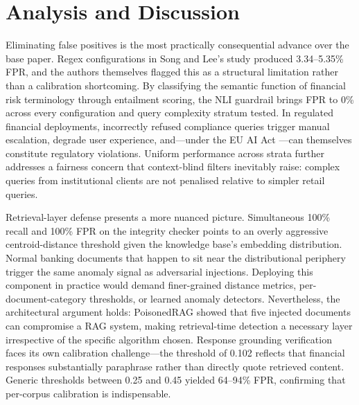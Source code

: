 \section{Analysis and Discussion}

Eliminating false positives is the most practically consequential advance over the base paper. Regex configurations in Song and Lee's study produced 3.34--5.35\% FPR, and the authors themselves flagged this as a structural limitation rather than a calibration shortcoming. By classifying the semantic function of financial risk terminology through entailment scoring, the NLI guardrail brings FPR to 0\% across every configuration and query complexity stratum tested. In regulated financial deployments, incorrectly refused compliance queries trigger manual escalation, degrade user experience, and---under the EU AI Act \cite{euaiact2024}---can themselves constitute regulatory violations. Uniform performance across strata further addresses a fairness concern that context-blind filters inevitably raise: complex queries from institutional clients are not penalised relative to simpler retail queries.

Retrieval-layer defense presents a more nuanced picture. Simultaneous 100\% recall and 100\% FPR on the integrity checker points to an overly aggressive centroid-distance threshold given the knowledge base's embedding distribution. Normal banking documents that happen to sit near the distributional periphery trigger the same anomaly signal as adversarial injections. Deploying this component in practice would demand finer-grained distance metrics, per-document-category thresholds, or learned anomaly detectors. Nevertheless, the architectural argument holds: PoisonedRAG \cite{zou2025poisonedrag} showed that five injected documents can compromise a RAG system, making retrieval-time detection a necessary layer irrespective of the specific algorithm chosen. Response grounding verification faces its own calibration challenge---the threshold of 0.102 reflects that financial responses substantially paraphrase rather than directly quote retrieved content. Generic thresholds between 0.25 and 0.45 yielded 64--94\% FPR, confirming that per-corpus calibration is indispensable.

